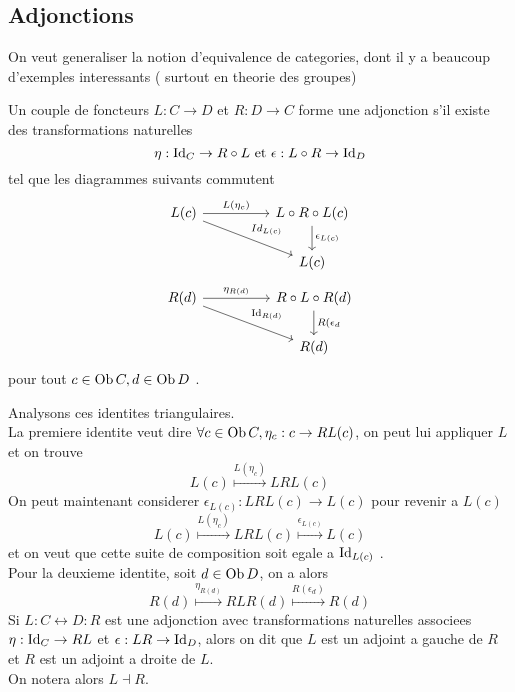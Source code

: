 \documentclass[../main.tex]{subfiles}
\begin{document}
\subsection{Adjonctions}
On veut generaliser la notion d'equivalence de categories, dont il y a beaucoup d'exemples interessants ( surtout en theorie des groupes) 
\begin{defn}[Adjonctions]
	Un couple de foncteurs $L:C\to D$ et $R:D\to C$ forme une adjonction s'il existe des transformations naturelles
\[ 
\eta: \operatorname{Id}_C\to R\circ L \text{ et } \epsilon:L\circ R \to \operatorname{Id}_D
\]
tel que les diagrammes suivants commutent
\[ 
	\begin{tikzcd}
L(c) \arrow[rr, "L(\eta_c)"] \arrow[rrd, "Id_{L(c)}"] &  & L\circ R\circ L(c) \arrow[d, "\epsilon_{L(c)}"] \\
                                                      &  & L(c)                                           
\end{tikzcd}
\]
\[
\begin{tikzcd}
R(d) \arrow[rr, "\eta_{R(d)}"] \arrow[rrd, "\id_{R(d)}"] &  & R\circ L\circ R(d) \arrow[d, "R(\epsilon_d"] \\
                                                        &  & R(d)                                         
\end{tikzcd}
\]
pour tout $c\in \operatorname{Ob} C, d \in \operatorname{Ob} D$ .\\
\end{defn}
Analysons ces identites triangulaires.\\
La premiere identite veut dire $\forall c \in \operatorname{Ob} C, \eta_c : c \to RL( c) $, on peut lui appliquer $L$ et on trouve
\[ 
	L( c) \overset { L( \eta_c) } { \longmapsto} LRL( c) 
\]
On peut maintenant considerer $\epsilon_{L( c) } : LRL( c) \to L( c) $ pour revenir a $L( c) $ 
\[ 
	L( c) \overset { L( \eta_c) } { \longmapsto} LRL( c) \overset { \epsilon_{L( c) }  } { \longmapsto} L( c) 
\]
et on veut que cette suite de composition soit egale a $\operatorname{Id}_{L( c) } $ .\\
Pour la deuxieme identite, soit $d \in \operatorname{Ob} D$, on a alors
\[ 
	R( d) \overset { \eta_{R( d) }  } { \longmapsto} RLR( d) \overset { R( \epsilon_d)   } { \longmapsto} R( d) 
\]
Si $L : C \leftrightarrow D : R$ est une adjonction avec transformations naturelles associees $\eta: \operatorname{Id}_C \to RL$ et $\epsilon : LR \to \operatorname{Id}_D$, alors on dit que $L$ est un adjoint a gauche de $R$ et $R$ est un adjoint a droite de $L$.\\
On notera alors $L \dashv R$.\\
\end{document}
